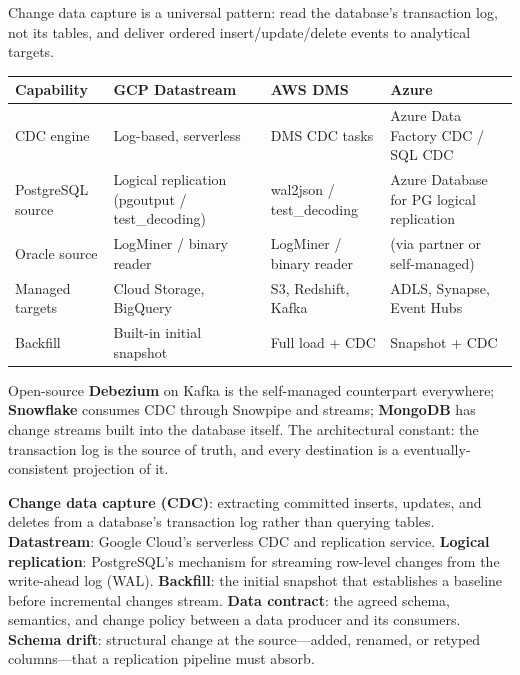 \begin{crosscloud}
Change data capture is a universal pattern: read the database's transaction log, not its tables, and deliver ordered insert/update/delete events to analytical targets.

\vspace{2mm}
{\footnotesize
\begin{tabular}{@{}p{2.8cm}p{3.0cm}p{3.0cm}p{3.0cm}@{}} \\
\toprule
\textbf{Capability} & \textbf{GCP Datastream} & \textbf{AWS DMS} & \textbf{Azure} \\
\midrule
CDC engine & Log-based, serverless & DMS CDC tasks & Azure Data Factory CDC / SQL CDC \\
PostgreSQL source & Logical replication (pgoutput / test\_decoding) & wal2json / test\_decoding & Azure Database for PG logical replication \\
Oracle source & LogMiner / binary reader & LogMiner / binary reader & (via partner or self-managed) \\
Managed targets & Cloud Storage, BigQuery & S3, Redshift, Kafka & ADLS, Synapse, Event Hubs \\
Backfill & Built-in initial snapshot & Full load + CDC & Snapshot + CDC \\
\bottomrule
\end{tabular}}

\vspace{1mm}
Open-source \textbf{Debezium} on Kafka is the self-managed counterpart everywhere; \textbf{Snowflake} consumes CDC through Snowpipe and streams; \textbf{MongoDB} has change streams built into the database itself. The architectural constant: the transaction log is the source of truth, and every destination is a eventually-consistent projection of it.
\end{crosscloud}

\begin{keyterms}
\textbf{Change data capture (CDC)}: extracting committed inserts, updates, and deletes from a database's transaction log rather than querying tables.
\textbf{Datastream}: Google Cloud's serverless CDC and replication service.
\textbf{Logical replication}: PostgreSQL's mechanism for streaming row-level changes from the write-ahead log (WAL).
\textbf{Backfill}: the initial snapshot that establishes a baseline before incremental changes stream.
\textbf{Data contract}: the agreed schema, semantics, and change policy between a data producer and its consumers.
\textbf{Schema drift}: structural change at the source---added, renamed, or retyped columns---that a replication pipeline must absorb.
\end{keyterms}

